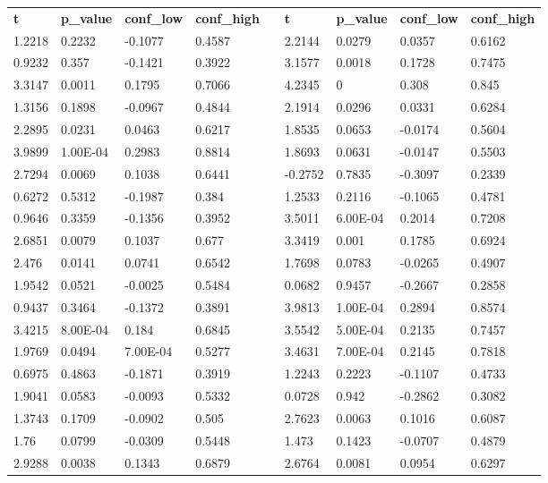 \begin{table}[h!]
\small
\begin{tabular}{lllllllll}
\textbf{t} & \textbf{p\_value} & \textbf{conf\_low} & \textbf{conf\_high} & \textbf{} & \textbf{t} & \textbf{p\_value} & \textbf{conf\_low} & \textbf{conf\_high} \\ \cline{1-4} \cline{6-9} 
1.2218 & 0.2232 & -0.1077 & 0.4587 &  & 2.2144 & 0.0279 & 0.0357 & 0.6162 \\
0.9232 & 0.357 & -0.1421 & 0.3922 &  & 3.1577 & 0.0018 & 0.1728 & 0.7475 \\
3.3147 & 0.0011 & 0.1795 & 0.7066 &  & 4.2345 & 0 & 0.308 & 0.845 \\
1.3156 & 0.1898 & -0.0967 & 0.4844 &  & 2.1914 & 0.0296 & 0.0331 & 0.6284 \\
2.2895 & 0.0231 & 0.0463 & 0.6217 &  & 1.8535 & 0.0653 & -0.0174 & 0.5604 \\
3.9899 & 1.00E-04 & 0.2983 & 0.8814 &  & 1.8693 & 0.0631 & -0.0147 & 0.5503 \\
2.7294 & 0.0069 & 0.1038 & 0.6441 &  & -0.2752 & 0.7835 & -0.3097 & 0.2339 \\
0.6272 & 0.5312 & -0.1987 & 0.384 &  & 1.2533 & 0.2116 & -0.1065 & 0.4781 \\
0.9646 & 0.3359 & -0.1356 & 0.3952 &  & 3.5011 & 6.00E-04 & 0.2014 & 0.7208 \\
2.6851 & 0.0079 & 0.1037 & 0.677 &  & 3.3419 & 0.001 & 0.1785 & 0.6924 \\
2.476 & 0.0141 & 0.0741 & 0.6542 &  & 1.7698 & 0.0783 & -0.0265 & 0.4907 \\
1.9542 & 0.0521 & -0.0025 & 0.5484 &  & 0.0682 & 0.9457 & -0.2667 & 0.2858 \\
0.9437 & 0.3464 & -0.1372 & 0.3891 &  & 3.9813 & 1.00E-04 & 0.2894 & 0.8574 \\
3.4215 & 8.00E-04 & 0.184 & 0.6845 &  & 3.5542 & 5.00E-04 & 0.2135 & 0.7457 \\
1.9769 & 0.0494 & 7.00E-04 & 0.5277 &  & 3.4631 & 7.00E-04 & 0.2145 & 0.7818 \\
0.6975 & 0.4863 & -0.1871 & 0.3919 &  & 1.2243 & 0.2223 & -0.1107 & 0.4733 \\
1.9041 & 0.0583 & -0.0093 & 0.5332 &  & 0.0728 & 0.942 & -0.2862 & 0.3082 \\
1.3743 & 0.1709 & -0.0902 & 0.505 &  & 2.7623 & 0.0063 & 0.1016 & 0.6087 \\
1.76 & 0.0799 & -0.0309 & 0.5448 &  & 1.473 & 0.1423 & -0.0707 & 0.4879 \\
2.9288 & 0.0038 & 0.1343 & 0.6879 &  & 2.6764 & 0.0081 & 0.0954 & 0.6297 \\

\end{tabular}
\end{table}
